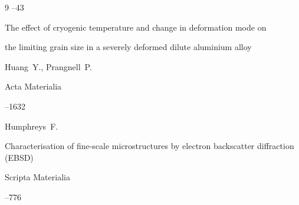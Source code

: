 \begin{thebibliography}{9}
--43




\paper The effect of cryogenic temperature and change in deformation mode on

the limiting grain size in a severely deformed dilute aluminium alloy

\by Huang~Y., Prangnell~P.

\jour Acta Materialia




--1632




\by Humphreys~F.

\paper Characterisation of fine-scale microstructures by electron backscatter diffraction (EBSD)

\jour Scripta Materialia



--776


\end{thebibliography}



\vspace{-8mm}



\makeengtitle



% 

